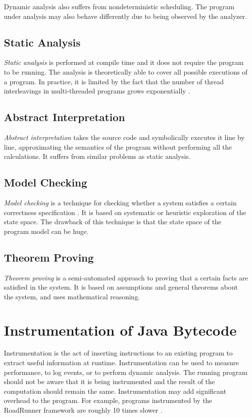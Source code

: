 Dynamic analysis also suffers from nondeterministic scheduling. The program
under analysis may also behave differently due to being observed by the
analyzer.

\subsection{Static Analysis}

\emph{Static analysis} is performed at compile time and it does not require the
program to be running. The analysis is theoretically able to cover all possible
executions of a program. In practice, it is limited by the fact that the number
of thread interleavings in multi-threaded programs grows exponentially
\cite{letko}.

\subsection{Abstract Interpretation}

\emph{Abstract interpretation} takes the source code and symbolically executes
it line by line, approximating the semantics of the program without performing
all the calculations. It suffers from similar problems as static analysis.

\subsection{Model Checking}

\emph{Model checking} is a technique for checking whether a system satisfies a
certain correctness specification \cite{letko}. It is based on systematic or
heuristic exploration of the state space. The drawback of this technique is that
the state space of the program model can be huge.

\subsection{Theorem Proving}

\emph{Theorem proving} is a semi-automated approach to proving that a certain
facts are satisfied in the system. It is based on assumptions and general
theorems about the system, and uses mathematical reasoning.

\section{Instrumentation of Java Bytecode}

Instrumentation is the act of inserting instructions to an existing program to
extract useful information at runtime. Instrumentation can be used to measure
performance, to log events, or to perform dynamic analysis. The running program
should not be aware that it is being instrumented and the result of the
computation should remain the same.  Instrumentation may add significant
overhead to the program. For example, programs instrumented by the RoadRunner
framework are roughly 10 times slower \cite{RoadRunner}.

